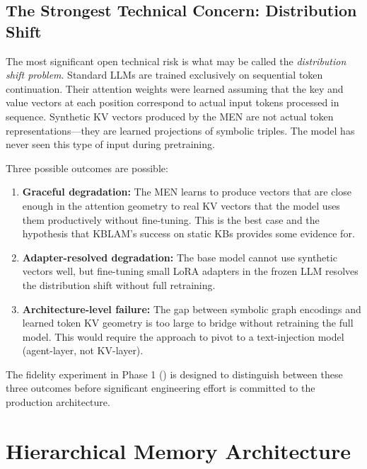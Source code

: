 \documentclass[11pt, a4paper, twoside]{article}
\theoremstyle{definition}
\begin{document}
\subsection{The Strongest Technical Concern: Distribution Shift}

The most significant open technical risk is what may be called the
\textit{distribution shift problem}. Standard LLMs are trained exclusively on
sequential token continuation. Their attention weights were learned assuming that
the key and value vectors at each position correspond to actual input tokens
processed in sequence. Synthetic KV vectors produced by the MEN are not actual
token representations---they are learned projections of symbolic triples. The
model has never seen this type of input during pretraining.

\medskip

Three possible outcomes are possible:
\begin{enumerate}[leftmargin=*]
  \item \textbf{Graceful degradation:} The MEN learns to produce vectors that
    are close enough in the attention geometry to real KV vectors that the model
    uses them productively without fine-tuning. This is the best case and the
    hypothesis that KBLAM's success on static KBs provides some evidence for.
  \item \textbf{Adapter-resolved degradation:} The base model cannot use
    synthetic vectors well, but fine-tuning small LoRA adapters in the frozen LLM
    resolves the distribution shift without full retraining.
  \item \textbf{Architecture-level failure:} The gap between symbolic graph
    encodings and learned token KV geometry is too large to bridge without
    retraining the full model. This would require the approach to pivot to a
    text-injection model (agent-layer, not KV-layer).
\end{enumerate}

The fidelity experiment in Phase 1 () is designed to distinguish
between these three outcomes before significant engineering effort is committed
to the production architecture.

\section{Hierarchical Memory Architecture}
\label{sec:hierarchy}
\end{document}
